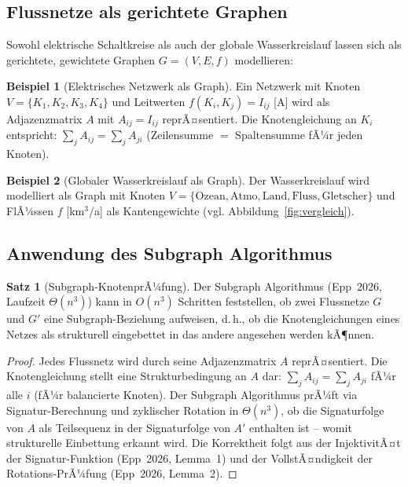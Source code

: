 ﻿\documentclass[a4paper,12pt]{article}
\theoremstyle{definition}
\newtheorem{beispiel}{Beispiel}
\newtheorem{satz}{Satz}
\begin{document}
\subsection{Flussnetze als gerichtete Graphen}

Sowohl elektrische Schaltkreise als auch der globale Wasserkreislauf
lassen sich als gerichtete, gewichtete Graphen $G = (V, E, f)$ modellieren:

\begin{beispiel}[Elektrisches Netzwerk als Graph]
  Ein Netzwerk mit Knoten $V = \{K_1, K_2, K_3, K_4\}$ und Leitwerten
  $f(K_i, K_j) = I_{ij}$ [A] wird als Adjazenzmatrix $A$ mit $A_{ij} = I_{ij}$
  reprÃ¤sentiert. Die Knotengleichung an $K_i$ entspricht:
  $\sum_j A_{ij} = \sum_j A_{ji}$ (Zeilensumme $=$ Spaltensumme fÃ¼r
  jeden Knoten).
\end{beispiel}

\begin{beispiel}[Globaler Wasserkreislauf als Graph]
  Der Wasserkreislauf wird modelliert als Graph mit Knoten
  $V = \{\mathrm{Ozean}, \mathrm{Atmo}, \mathrm{Land}, \mathrm{Fluss},
  \mathrm{Gletscher}\}$ und FlÃ¼ssen $f$ [km$^3$/a] als Kantengewichte
  (vgl. Abbildung~\ref{fig:vergleich}).
\end{beispiel}

\subsection{Anwendung des Subgraph Algorithmus}

\begin{satz}[Subgraph-KnotenprÃ¼fung]
  \label{satz:subgraph}
  Der Subgraph Algorithmus (Epp~2026, Laufzeit $\Theta(n^3)$) kann in
  $O(n^3)$ Schritten feststellen, ob zwei Flussnetze $G$ und $G'$ eine
  Subgraph-Beziehung aufweisen, d.\,h., ob die Knotengleichungen eines
  Netzes als strukturell eingebettet in das andere angesehen werden kÃ¶nnen.
\end{satz}

\begin{proof}
  Jedes Flussnetz wird durch seine Adjazenzmatrix $A$ reprÃ¤sentiert.
  Die Knotengleichung stellt eine Struktur\-bedingung an $A$ dar:
  $\sum_j A_{ij} = \sum_j A_{ji}$ fÃ¼r alle $i$ (fÃ¼r balancierte Knoten).
  Der Subgraph Algorithmus prÃ¼ft via Signatur-Berechnung und zyklischer
  Rotation in $\Theta(n^3)$, ob die Signaturfolge von $A$ als Teilsequenz
  in der Signaturfolge von $A'$ enthalten ist -- womit strukturelle
  Einbettung erkannt wird. Die Korrektheit folgt aus der InjektivitÃ¤t
  der Signatur-Funktion (Epp~2026, Lemma~1) und der VollstÃ¤ndigkeit
  der Rotations-PrÃ¼fung (Epp~2026, Lemma~2). \qedhere
\end{proof}
\end{document}
